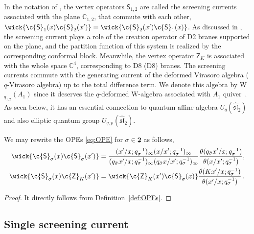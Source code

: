 In the notation of \cite[Proposition C.3]{Kimura:2023bxy}, the vertex operators $\mathsf{S}_{1,2}$ are called the screening currents associated with the plane $\mathbb{C}_{1,2}$, that commute with each other, $\wick{ \c {\mathsf{S}}_1(x) \c {\mathsf{S}}_2(x') } = \wick{ \c {\mathsf{S}}_2(x') \c {\mathsf{S}}_1(x) }$.
As discussed in \cite{Kimura:2023bxy}, the screening current plays a role of the creation operator of D2 branes supported on the plane, and the partition function of this system is realized by the corresponding conformal block.
Meanwhile, the vertex operator $\mathsf{Z}_K$ is associated with the whole space $\mathbb{C}^4$, corresponding to D8 ($\overline{\text{D8}}$) branes.
The screening currents commute with the generating current of the deformed Virasoro algebra ($q$-Virasoro algebra) up to the total difference term.
We denote this algebra by W$_{q_{1,2}}(A_1)$ since it deserves the $q$-deformed W-algebra associated with $A_1$ quiver~\cite{Kimura:2015rgi}.
As seen below, it has an essential connection to quantum affine algebra $U_q(\widehat{\mathfrak{sl}}_2)$ and also elliptic quantum group $U_{q,p}(\widehat{\mathfrak{sl}}_2)$.


\begin{lemma}\label{lemma:OPE_flip}
    We may rewrite the OPEs \eqref{eq:OPE} for $\sigma \in \underline{\mathbf{2}}$ as follows,
    \begin{subequations}
    \begin{align}
        \wick{ \c {\mathsf{S}}_\sigma(x) \c {\mathsf{S}}_\sigma(x') } & = \frac{(x'/x;q_\sigma^{-1})_\infty (x/x';q_\sigma^{-1})_\infty}{(q_{\bar{\sigma}} x'/x;q_\sigma^{-1})_\infty (q_{\bar{\sigma}} x/x';q_\sigma^{-1})_\infty} \frac{\theta(q_{\bar{\sigma}}x'/x;q_\sigma^{-1})}{\theta(x/x';q_\sigma^{-1})} , \\
        \wick{ \c {\mathsf{S}}_\sigma(x) \c {\mathsf{Z}}_K(x') } & = \wick{ \c {\mathsf{Z}}_K(x') \c {\mathsf{S}}_\sigma(x) } \frac{\theta(K x'/x;q_\sigma^{-1})}{\theta(x'/x;q_\sigma^{-1})} \, .
    \end{align}
    \end{subequations}    
\end{lemma}
\begin{proof}
    It directly follows from Definition~\ref{def:OPEs}.
\end{proof}

\subsection{Single screening current}

